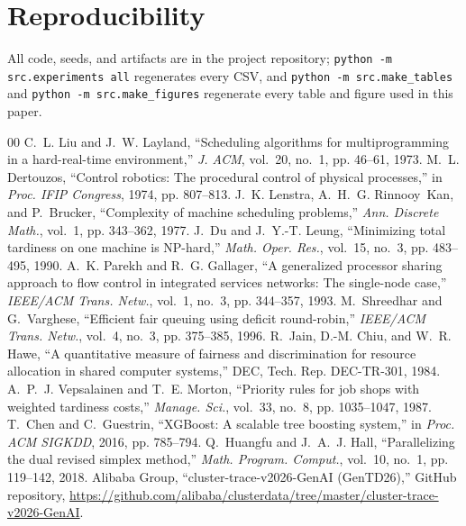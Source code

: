 \documentclass[conference]{IEEEtran}
\begin{document}
\section*{Reproducibility}
All code, seeds, and artifacts are in the project repository; \texttt{python -m src.experiments all} regenerates every CSV, and \texttt{python -m src.make\_tables} and \texttt{python -m src.make\_figures} regenerate every table and figure used in this paper.

\begin{thebibliography}{00}
 C.~L. Liu and J.~W. Layland, ``Scheduling algorithms for multiprogramming in a hard-real-time environment,'' \emph{J. ACM}, vol.~20, no.~1, pp. 46--61, 1973.
 M.~L. Dertouzos, ``Control robotics: The procedural control of physical processes,'' in \emph{Proc. IFIP Congress}, 1974, pp. 807--813.
 J.~K. Lenstra, A.~H.~G. Rinnooy~Kan, and P.~Brucker, ``Complexity of machine scheduling problems,'' \emph{Ann. Discrete Math.}, vol.~1, pp. 343--362, 1977.
 J.~Du and J.~Y.-T. Leung, ``Minimizing total tardiness on one machine is NP-hard,'' \emph{Math. Oper. Res.}, vol.~15, no.~3, pp. 483--495, 1990.
 A.~K. Parekh and R.~G. Gallager, ``A generalized processor sharing approach to flow control in integrated services networks: The single-node case,'' \emph{IEEE/ACM Trans. Netw.}, vol.~1, no.~3, pp. 344--357, 1993.
 M.~Shreedhar and G.~Varghese, ``Efficient fair queuing using deficit round-robin,'' \emph{IEEE/ACM Trans. Netw.}, vol.~4, no.~3, pp. 375--385, 1996.
 R.~Jain, D.-M. Chiu, and W.~R. Hawe, ``A quantitative measure of fairness and discrimination for resource allocation in shared computer systems,'' DEC, Tech. Rep. DEC-TR-301, 1984.
 A.~P.~J. Vepsalainen and T.~E. Morton, ``Priority rules for job shops with weighted tardiness costs,'' \emph{Manage. Sci.}, vol.~33, no.~8, pp. 1035--1047, 1987.
 T.~Chen and C.~Guestrin, ``XGBoost: A scalable tree boosting system,'' in \emph{Proc. ACM SIGKDD}, 2016, pp. 785--794.
 Q.~Huangfu and J.~A.~J. Hall, ``Parallelizing the dual revised simplex method,'' \emph{Math. Program. Comput.}, vol.~10, no.~1, pp. 119--142, 2018.
 Alibaba Group, ``cluster-trace-v2026-GenAI (GenTD26),'' GitHub repository, \url{https://github.com/alibaba/clusterdata/tree/master/cluster-trace-v2026-GenAI}.
\end{thebibliography}
\end{document}
